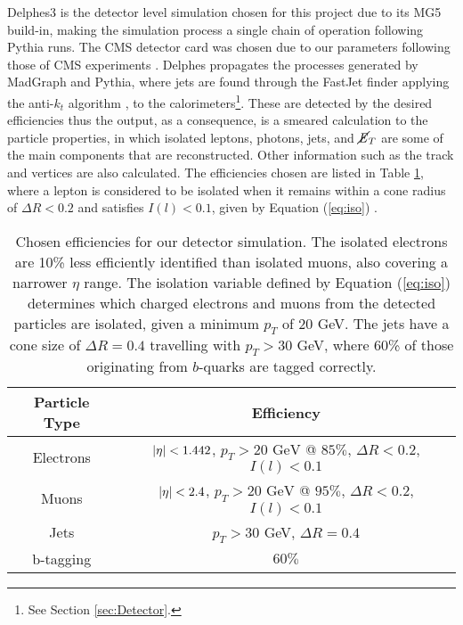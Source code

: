 Delphes3 \cite{de2014delphes} is the detector level simulation chosen for this project due to its MG5 build-in, making the simulation process a single chain of operation following Pythia runs. The CMS detector card was chosen due to our parameters following those of CMS experiments \cite{cms2019search, cms2016searches, cms2017search}. Delphes propagates the processes generated by MadGraph and Pythia, where jets are found through the FastJet finder \cite{cacciari2012fastjet} applying the anti-$k_t$ algorithm \cite{cacciari2008anti}, to the calorimeters\footnote{See Section \ref{sec:Detector}.}. These are detected by the desired efficiencies thus the output, as a consequence, is a smeared calculation to the particle properties, in which isolated leptons, photons, jets, and $\cancel{\it{E}}_{T}$ are some of the main components that are reconstructed. Other information such as the track and vertices are also calculated. The efficiencies chosen are listed in Table \ref{tab:efficiencies}, where a lepton is considered to be isolated when it remains within a cone radius of $\Delta R <0.2$ and satisfies $I(l)<0.1$, given by Equation (\ref{eq:iso}) \cite{de2014delphes}. \\

\begin{table}[htbp]
    \centering
    \begin{tabular}{c|c}
    \toprule
    Particle Type & Efficiency \\
    \midrule
    \rowcolor{gray!6} Electrons & $\abs{\eta} < 1.442$, $p_T > 20\text{ GeV}$ @ $85\%$, $\Delta R <0.2$, $I(l) <0.1$\\
    Muons & $\abs{\eta} < 2.4$, $p_T > 20\text{ GeV}$ @ $95\%$, $\Delta R < 0.2$, $I(l) <0.1$\\
    \rowcolor{gray!6} Jets & $p_T>30$ GeV, $\Delta R = 0.4$\\
    b-tagging & $60\%$ \\
    \bottomrule
    \end{tabular}
    \caption{Chosen efficiencies for our detector simulation. The isolated electrons are 10\% less efficiently identified than isolated muons, also covering a narrower $\eta$ range. The isolation variable defined by Equation (\ref{eq:iso}) determines which charged electrons and muons from the detected particles are isolated, given a minimum $p_T$ of 20 GeV. The jets have a cone size of $\Delta R = 0.4$ travelling with $p_T>30$ GeV, where 60\% of those originating from $b$-quarks are tagged correctly.} 
    \label{tab:efficiencies}    
\end{table}

